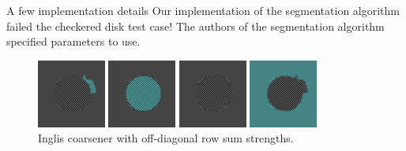 \documentclass[8pt]{beamer}
\begin{document}
\begin{frame}{A few implementation details}
   Our implementation of the segmentation algorithm failed the checkered disk test case!  The authors of the segmentation algorithm specified parameters to use.

   \begin{figure}[ht]
      \centering
      \includegraphics[width=0.2\textwidth]{checker_disk_60_seg_blend_segAMG_row_sum_0000.png} \hspace{0.45cm}
      \includegraphics[width=0.2\textwidth]{checker_disk_60_seg_blend_segAMG_row_sum_0001.png} \hspace{0.45cm}
      \includegraphics[width=0.2\textwidth]{checker_disk_60_seg_blend_segAMG_row_sum_0002.png} \hspace{0.45cm}
      \includegraphics[width=0.2\textwidth]{checker_disk_60_seg_blend_segAMG_row_sum_0003.png}
      ~\\Inglis coarsener with off-diagonal row sum strengths.
   \end{figure}


\end{frame}
\end{document}
